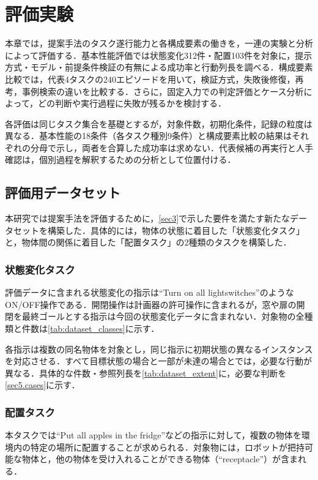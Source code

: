 \section{評価実験}\label{sec5}

本章では，提案手法のタスク遂行能力と各構成要素の働きを，一連の実験と分析によって評価する．基本性能評価では状態変化312件・配置103件を対象に，提示方式・モデル・前提条件検証の有無による成功率と行動列長を調べる．構成要素比較では，代表4タスクの240エピソードを用いて，検証方式，失敗後修復，再考，事例検索の違いを比較する．さらに，固定入力での判定評価とケース分析によって，どの判断や実行過程に失敗が残るかを検討する．

各評価は同じタスク集合を基礎とするが，対象件数，初期化条件，記録の粒度は異なる．基本性能の18条件（各タスク種別9条件）と構成要素比較の結果はそれぞれの分母で示し，両者を合算した成功率は求めない．代表候補の再実行と人手確認は，個別過程を解釈するための分析として位置付ける．

\subsection{評価用データセット}\label{sec5.1}
本研究では提案手法を評価するために，\ref{sec3}で示した要件を満たす新たなデータセットを構築した．具体的には，物体の状態に着目した「状態変化タスク」と，物体間の関係に着目した「配置タスク」の2種類のタスクを構築した．

\subsubsection{状態変化タスク}
評価データに含まれる状態変化の指示は``Turn on all lightswitches''のようなON/OFF操作である．開閉操作は計画器の許可操作に含まれるが，窓や扉の開閉を最終ゴールとする指示は今回の状態変化データに含まれない．対象物の全種類と件数は\ref{tab:dataset_classes}に示す．

各指示は複数の同名物体を対象とし，同じ指示に初期状態の異なるインスタンスを対応させる．すべて目標状態の場合と一部が未達の場合とでは，必要な行動が異なる．具体的な件数・参照列長を\ref{tab:dataset_extent}に，必要な判断を\ref{sec5.cases}に示す．

\subsubsection{配置タスク}
本タスクでは``Put all apples in the fridge''などの指示に対して，複数の物体を環境内の特定の場所に配置することが求められる．対象物には，ロボットが把持可能な物体と，他の物体を受け入れることができる物体（``receptacle''）が含まれる．

